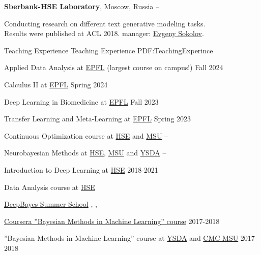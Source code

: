 \documentclass[letterpaper,MMMyyyy,nonstopmode]{simpleresumecv}
\begin{document}
\begin{Body}
\Entry
\textbf{Sberbank-HSE Laboratory}, Moscow, Russia
\hfill
{} --
\begin{Detail}
Conducting research on different text generative modeling tasks.\\
Results were published at ACL 2018. manager: \href{https://www.hse.ru/en/staff/esokolov}{Evgeny Sokolov}.
\end{Detail}


\Section
{Teaching Experience}
{Teaching Experience}
{PDF:TeachingExperince}

\Entry
Applied Data Analysis at \href{https://edu.epfl.ch/coursebook/en/applied-data-analysis-CS-401}{EPFL} (largest course on campus!)
\hfill
Fall 2024
\Gap

\Entry
Calculus II at \href{https://edu.epfl.ch/coursebook/en/analysis-ii-MATH-106-E}{EPFL}
\hfill
Spring 2024
\Gap

\Entry
Deep Learning in Biomedicine at \href{https://edu.epfl.ch/coursebook/en/deep-learning-in-biomedicine-CS-502}{EPFL}
\hfill
Fall 2023
\Gap

\Entry
Transfer Learning and Meta-Learning at \href{https://edu.epfl.ch/coursebook/en/transfer-learning-and-meta-learning-CS-625}{EPFL}
\hfill
Spring 2023
\Gap

\Entry
Continuous Optimization course at \href{https://cs.hse.ru/en/}{HSE} and \href{https://cs.msu.ru/en}{MSU}
\hfill
{} --
\Gap

\Entry
Neurobayesian Methods at \href{https://cs.hse.ru/en/}{HSE}, \href{https://cs.msu.ru/en}{MSU} and \href{https://yandexdataschool.com}{YSDA}
\hfill
{} --
\Gap

\Entry
Introduction to Deep Learning at \href{https://cs.hse.ru/en/}{HSE}
\hfill
2018-2021
\Gap

\Entry
Data Analysis course at \href{https://cs.hse.ru/en/}{HSE}
\hfill
{}
\Gap

\Entry
\href{http://deepbayes.ru}{DeepBayes Summer School}
\hfill
{}, , 
\Gap

\Entry
\href{https://www.coursera.org/learn/bayesian-methods-in-machine-learning}
{Coursera ”Bayesian Methods in Machine Learning” course}
\hfill
2017-2018
\Gap

\Entry
”Bayesian Methods in Machine Learning” course at \href{https://yandexdataschool.com}{YSDA}
and \href{https://cs.msu.ru/en}{CMC MSU}
\hfill
2017-2018
\Gap


\end{Body}
\end{document}
